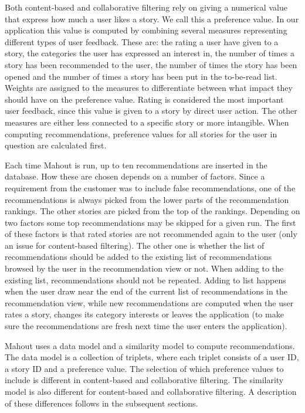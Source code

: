 Both content-based and collaborative filtering rely on giving a numerical value that express how much a user likes a story. We call this a preference value. In our application this value is computed by combining several measures representing different types of user feedback. These are: the rating a user have given to a story, the categories the user has expressed an interest in, the number of times a story has been recommended to the user, the number of times the story has been opened and the number of times a story has been put in the to-be-read list. Weights are assigned to the measures to differentiate between what impact they should have on the preference value. Rating is considered the most important user feedback, since this value is given to a story by direct user action. The other measures are either less connected to a specific story or more intangible. When computing recommendations, preference values for all stories for the user in question are calculated first.\newline

Each time Mahout is run, up to ten recommendations are inserted in the database. How these are chosen depends on a number of factors. Since a requirement from the customer was to include false recommendations, one of the recommendations is always picked from the lower parts of the recommendation rankings. The other stories are picked from the top of the rankings. Depending on two factors some top recommendations may be skipped for a given run. The first of these factors is that rated stories are not recommended again to the user (only an issue for content-based filtering). The other one is whether the list of recommendations should be added to the existing list of recommendations browsed by the user in the recommendation view or not. When adding to the existing list, recommendations should not be repeated. Adding to list happens when the user draw near the end of the current list of recommendations in the recommendation view, while new recommendations are computed when the user rates a story, changes its category interests or leaves the application (to make sure the recommendations are fresh next time the user enters the application).\newline

Mahout uses a data model and a similarity model to compute recommendations. The data model is a collection of triplets, where each triplet consists of a user ID, a story ID and a preference value. The selection of which preference values to include is different in content-based and collaborative filtering. The similarity model is also different for content-based and collaborative filtering. A description of these differences follows in the subsequent sections.    

